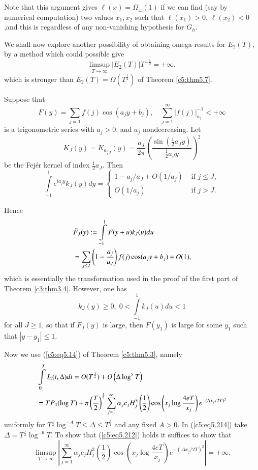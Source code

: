 Note that this argument gives $\ell(x) = \Omega_{\pm} (1)$ if we can
find (say by numerical computation) two values $x_1,x_2$ such that
$\ell(x_1) >0$, $\ell (x_2)< 0$,\pageoriginale and this is regardless
of any non-vanishing hypothesis for $G_h$. 

We shall now explore another possibility of obtaining omega-results
for $E_2(T)$, by a method which could possible give 
\begin{equation}
\limsup\limits_{T\to \infty} |E_2(T)|T^{-\frac{1}{2}} = + \infty,
\label{c5:eq5.212} 
\end{equation}
which is stronger than $E_2(T) = \Omega (T^{\frac{1}{2}})$ of Theorem
\ref{c5:thm5.7}. 

Suppose that
$$
F(y) = \sum\limits_{j=1} f(j) \cos \left(a_j y + b_j\right), \quad
\sum\limits^\infty_{j=1} |f(j)|^{-1}_{a_j} < + \infty 
$$
is a trigonometric series with $a_j >0$, and $a_j$ nondecreasing. Let 
$$
K_J (y) = K_{a_{\frac{1}{2} J}} (y) = \frac{a_J}{2\pi} \left(
\frac{\sin (\frac{1}{2} a_J y)}{\frac{1}{2} a_Jy} \right)^2 
$$
be the Fej\'er kernel of index $\frac{1}{2} a_J$. Then
$$
\int\limits^1_{-1} e^{ia_jy} k_J(y) dy = 
\begin{cases}
1-a_j/a_J + O (1/a_j) & \text{ if } j \leq J,\\
O (1/a_j)  & \text{ if } j > J.
\end{cases}
$$

Hence
\begin{align}
& \tilde{F}_J(y) : = \int\limits^1_{-1} F(y+u) k_J(u) du
  \label{c5:eq5.213}\\ 
& = \sum\limits_{j \leq J} \left(1-\frac{a_j}{a_J} \right) f(j) \cos
  (a_j y + b_j) + O(1),\notag 
\end{align}
which is essentially the transformation used in the proof of the first
part of Theorem \ref{c3:thm3.4}. However, one has 
$$
k_J (y) \geq 0, \; 0 < \int\limits^1_{-1} k_J (u) du < 1 
$$
for all $J  \geq 1$, so that if $\tilde{F}_J(y)$ is large, then
$F(y_1)$ is large for some $y_1$ such that $|y - y_1| \leq 1$. 

Now we use (\ref{c5:eq5.14}) of Theorem \ref{c5:thm5.3}, namely
\begin{align}  
& \int\limits^T_0 I_4 (t,\Delta) dt = O (T^{\frac{1}{2}})  
+ O \left(\Delta \log^5 T\right)\label{c5:eq5.214}\\
& = T P_4 (\log T) + \pi \left(\frac{T}{2} \right)^{\frac{1}{2}}
  \sum\limits^\infty_{j=1} \alpha_j c_j H^3_j \left(\frac{1}{2}
  \right) \cos \left(x_j \log \frac{4 eT}{x_j} \right) e^{-(\Delta
    x_j/ 2T)^2}\notag 
\end{align}\pageoriginale
uniformly for $T^{\frac{1}{2}} \log^{-A} T \leq \Delta \leq
T^{\frac{3}{4}} $ and any fixed $A>0$. In (\ref{c5:eq5.214}) take
$\Delta = T^{\frac{1}{2}} \log^{-6} T$. To show that
(\ref{c5:eq5.212}) holds it suffices to show that 
\begin{equation}
\limsup\limits_{T\to \infty} \left| \sum\limits^{\infty}_{j=1}
\alpha_j c_j H^3_j \left(\frac{1}{2} \right) \cos \left(x_j \log
\frac{4eT}{x_j} \right) e^{-(\Delta x_j / 2T)^2} \right| = + \infty
. \label{c5:eq5.215} 
\end{equation}


